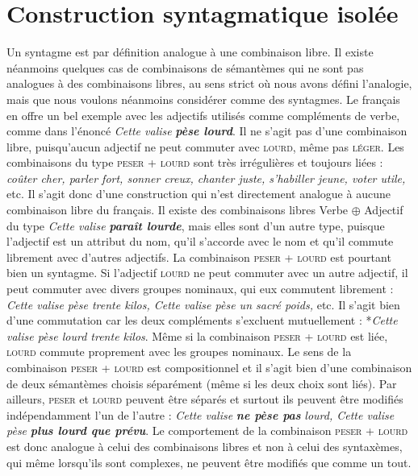 \section{Construction syntagmatique isolée}\label{sec:3.1.14}

Un syntagme est par définition analogue à une combinaison libre. Il existe néanmoins quelques cas de combinaisons de sémantèmes qui ne sont pas analogues à des combinaisons libres, au sens strict où nous avons défini l’analogie, mais que nous voulons néanmoins considérer comme des syntagmes. Le français en offre un bel exemple avec les adjectifs utilisés comme compléments de verbe, comme dans l’énoncé \textit{Cette valise} \textbf{\textit{pèse lourd}}. Il ne s’agit pas d’une combinaison libre, puisqu’aucun adjectif ne peut commuter avec \textsc{lourd}, même pas \textsc{léger}. Les combinaisons du type \textsc{peser} + \textsc{lourd} sont très irrégulières et toujours liées : \textit{coûter cher, parler fort, sonner creux, chanter juste, s’habiller jeune, voter utile,} etc. Il s’agit donc d’une construction qui n’est directement analogue à aucune combinaison libre du français. Il existe des combinaisons libres Verbe ${\oplus}$ Adjectif du type \textit{Cette valise} \textbf{\textit{paraît lourde}}, mais elles sont d’un autre type, puisque l’adjectif est un attribut du nom, qu’il s’accorde avec le nom et qu’il commute librement avec d’autres adjectifs. La combinaison \textsc{peser} + \textsc{lourd} est pourtant bien un syntagme. Si l’adjectif \textsc{lourd} ne peut commuter avec un autre adjectif, il peut commuter avec divers groupes nominaux, qui eux commutent librement : \textit{Cette valise pèse trente kilos, Cette valise pèse un sacré poids,} etc. Il s’agit bien d’une commutation car les deux compléments s’excluent mutuellement : *\textit{Cette valise pèse lourd trente kilos}. Même si la combinaison \textsc{peser} + \textsc{lourd} est liée, \textsc{lourd} commute proprement avec les groupes nominaux. Le sens de la combinaison \textsc{peser} + \textsc{lourd} est compositionnel et il s’agit bien d’une combinaison de deux sémantèmes choisis séparément (même si les deux choix sont liés). Par ailleurs, \textsc{peser} et \textsc{lourd} peuvent être séparés et surtout ils peuvent être modifiés indépendamment l’un de l’autre : \textit{Cette valise} \textbf{\textit{ne pèse pas}} \textit{lourd, Cette valise pèse} \textbf{\textit{plus lourd que prévu}}. Le comportement de la combinaison \textsc{peser} + \textsc{lourd} est donc analogue à celui des combinaisons libres et non à celui des syntaxèmes, qui même lorsqu’ils sont complexes, ne peuvent être modifiés que comme un tout.

